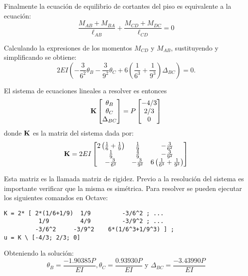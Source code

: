 Finalmente la ecuación de equilibrio de cortantes del piso es equivalente a la ecuación:
\begin{equation}
\frac{M_{AB}+M_{BA}}{\ell_{AB}}
+ 
\frac{M_{CD}+M_{DC}}{\ell_{CD}} = 0
\end{equation}

Calculando la expresiones de los momentos $M_{CD}$ y $M_{AB}$, sustituyendo y simplificando se obtiene:
\begin{equation}
\boxed{
	2EI \left( -\frac{3}{6^2} \theta_B - \frac{3}{9^2} \theta_C + 6 \left( \frac{1}{6^3} +  \frac{1}{9^3} \right) \Delta_{BC} \right) = 0.
}
\end{equation}

El sistema de ecuaciones lineales a resolver es entonces
\begin{equation}
{\bf K}   
\left[
\begin{matrix}
\theta_B\\
\theta_C\\
\Delta_{BC}
\end{matrix}
\right]
=
P
\left[
\begin{matrix}
-4/3\\
2/3\\
0
\end{matrix}
\right]
\end{equation}
donde ${\bf K}$ es la matriz del sistema dada por: 
\begin{equation}
{\bf K} =
2EI \left[
\begin{matrix}
2 \left( \frac{1}{6}+ \frac{1}{9}\right) & \frac{1}{9} & -\frac{3}{6^2}\\
\frac{1}{9} & \frac{4}{9} & -\frac{3}{9^2}\\
-\frac{3}{6^2} & -\frac{3}{9^2} &  6\left( \frac{1}{6^3}  + \frac{1}{9^3}\right)
\end{matrix}
\right]
\end{equation}

Esta matriz es la llamada matriz de rigidez. Previo a la resolución del sistema es importante verificar que la misma es simétrica. %
%
Para resolver se pueden ejecutar los siguientes comandos en Octave:

\begin{verbatim}
K = 2* [ 2*(1/6+1/9)  1/9         -3/6^2 ; ...
          1/9         4/9         -3/9^2 ; ...
         -3/6^2     -3/9^2    6*(1/6^3+1/9^3) ] ;
u = K \ [-4/3; 2/3; 0]
\end{verbatim}


Obteniendo la solución:
\begin{equation}
\theta_B = \frac{ -1.90385 P }{EI}, \theta_C = \frac{ 0.93930
 P }{EI} \text{ y } \Delta_{BC} = \frac{-3.43990 P }{EI}
\end{equation}

